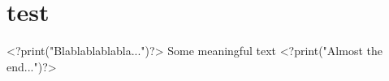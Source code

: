 \documentclass[a4paper,11pt]{article}
\begin{document}
\section{test}
<?print("Blablablablabla...")?>
Some meaningful text
<?print("Almost the end...")?>
\end{document}
